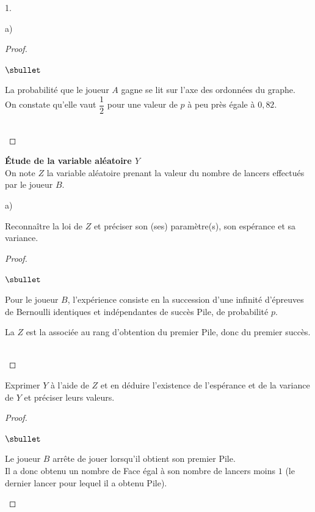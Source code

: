 \documentclass[11pt]{article}%
\begin{document}
\begin{noliste}{1.}
\begin{noliste}{a)}
\begin{proof}
\begin{noliste}{$\sbullet$}
      \item La probabilité que le joueur $A$ gagne se lit sur l'axe 
      des ordonnées du graphe.\\
      On constate qu'elle vaut $\dfrac{1}{2}$ pour une valeur de $p$
      à peu près égale à $0,82$.
     \end{noliste}
     ~\\[-1cm]
    \end{proof}
  \end{noliste}
  
  \item {\bf Étude de la variable aléatoire $Y$}\\[.1cm]
  On note $Z$ la variable aléatoire prenant la valeur du nombre de 
  lancers effectués par le joueur $B$.
  \begin{noliste}{a)}
    \setlength{\itemsep}{2mm}
    \item Reconnaître la loi de $Z$ et préciser son (ses) paramètre(s), 
    son espérance et sa variance.
    
    \begin{proof}~
      \begin{noliste}{$\sbullet$}
	\item Pour le joueur $B$, l'expérience consiste en la 
	succession d'une infinité d'épreuves de Bernoulli 
	identiques et indépendantes de succès Pile, de probabilité $p$.
	
	\item La \var $Z$ est la \var associée au rang d'obtention 
	du premier Pile, donc du premier succès.
      \end{noliste}
      ~\\[-1cm]
    \end{proof}

    
    \item Exprimer $Y$ à l'aide de $Z$ et en déduire l'existence de 
    l'espérance et de la variance de $Y$ et préciser leurs valeurs.
    
    \begin{proof}~
     \begin{noliste}{$\sbullet$}
      \item Le joueur $B$ arrête de jouer lorsqu'il obtient son premier 
      Pile.\\
      Il a donc obtenu un nombre de Face égal à son nombre de lancers 
      moins $1$ (le dernier lancer pour lequel il a obtenu Pile).
      

\end{noliste}
\end{proof}
\end{noliste}
\end{noliste}
\end{document}
